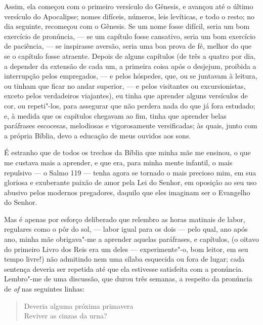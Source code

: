 Assim, ela começou com o primeiro versículo do Gênesis, e avançou até o
último versículo do Apocalipse; nomes difíceis, números, leis levíticas,
e todo o resto; no dia seguinte, recomeçou com o Gênesis. Se um nome
fosse difícil, seria um bom exercício de pronúncia, --- se um capítulo
fosse cansativo, seria um bom exercício de paciência, --- se inspirasse
aversão, seria uma boa prova de fé, melhor do que se o capítulo fosse
atraente. Depois de alguns capítulos (de três a quatro por dia, a
depender da extensão de cada um, a primeira coisa após o desjejum,
proibida a interrupção pelos empregados, --- e pelos hóspedes, que, ou se
juntavam à leitura, ou tinham que ficar no andar superior, --- e pelos
visitantes ou excursionistas, exceto pelos verdadeiros viajantes), eu
tinha que aprender alguns versículos de cor, ou repeti"-los, para
assegurar que não perdera nada do que já fora estudado; e, à medida que
os capítulos chegavam ao fim, tinha que aprender belas paráfrases
escocesas, melodiosas e vigorosamente versificadas; às quais, junto com
a própria Bíblia, devo a educação de meus ouvidos aos sons.

É estranho que de todos os trechos da Bíblia que minha mãe me ensinou, o
que me custava mais a aprender, e que era, para minha mente infantil, o
mais repulsivo --- o Salmo 119 --- tenha agora se tornado o mais
precioso mim, em sua gloriosa e exuberante paixão de amor pela Lei do
Senhor, em oposição ao seu uso abusivo pelos modernos pregadores,
daquilo que eles imaginam ser o Evangelho do Senhor.

Mas é apenas por esforço deliberado que relembro as horas matinais
de labor, regulares como o pôr do sol, --- labor igual para os dois ---
pelo qual, ano após ano, minha mãe obrigava"-me a aprender aquelas
paráfrases, e capítulos, (o oitavo do primeiro Livro dos Reis era um deles ---
experimente"-o, bom leitor, em seu tempo livre!) não admitindo nem uma
sílaba esquecida ou fora de lugar; cada sentença deveria ser repetida
até que ela estivesse satisfeita com a pronúncia. Lembro"-me de uma
discussão, que durou três semanas, a respeito da pronúncia de \textit{of} nas
seguintes linhas:

\begin{verse}
Deveria alguma próxima primavera\\
Reviver as cinzas da urna?\footnotemark
\end{verse}


